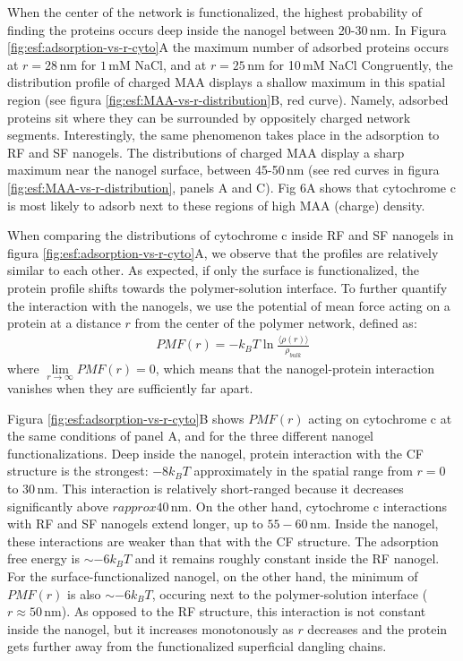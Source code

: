 When the center of the network is functionalized, the highest probability of finding the proteins occurs deep inside the nanogel between 20-30\,nm.
In Figura \ref{fig:esf:adsorption-vs-r-cyto}A the maximum number of adsorbed proteins occurs at $r=28$\,nm for $1$\,mM NaCl, and at $r=25$\,nm for 10\,mM NaCl%
Congruently, the distribution profile of charged MAA displays a shallow maximum in this spatial region (see figura \ref{fig:esf:MAA-vs-r-distribution}B, red curve).
Namely, adsorbed proteins sit where they can be surrounded by oppositely charged network segments.
Interestingly, the same phenomenon takes place in the adsorption to RF and SF nanogels.
The distributions of charged MAA display a sharp maximum near the nanogel surface, between 45-50\,nm (see red curves in  figura \ref{fig:esf:MAA-vs-r-distribution}, panels A and C).
Fig 6A shows that cytochrome c is most likely to adsorb next to these  regions of high MAA (charge) density.



When comparing the distributions of cytochrome c inside RF and SF nanogels in figura \ref{fig:esf:adsorption-vs-r-cyto}A, we observe that the profiles are relatively similar to each other.
As expected, if only the surface is functionalized, the protein profile shifts towards the polymer-solution interface.
To further quantify the interaction with the nanogels, we use the potential of mean force acting on a protein at a distance $r$ from the center of the polymer network, defined as:
\begin{align}
   {PMF} (r) = -k_B T \ln \frac{\langle \rho(r)\rangle}{\rho_{bulk}}
\end{align}
where $\lim\limits_{r\to \infty}{PMF}(r)=0$, which means that the nanogel-protein interaction vanishes when they are sufficiently far apart.





Figura \ref{fig:esf:adsorption-vs-r-cyto}B shows ${PMF}(r)$ acting on cytochrome c at the same conditions of panel A, and for the three different nanogel functionalizations.
Deep inside the nanogel, protein interaction with the CF structure is the strongest: $-8k_B T$ approximately in the spatial range from $r=0$ to 30\,nm.
This interaction is relatively short-ranged because it decreases significantly above $r approx 40$\,nm.
On the other hand,  cytochrome c interactions with RF and SF nanogels extend longer, up to $55-60$\,nm.
Inside the nanogel, these interactions are weaker than that with the CF structure.
The adsorption free energy is $\sim -6 k_BT$ and it remains roughly constant inside the RF nanogel.
For the surface-functionalized nanogel, on the other hand, the minimum of ${PMF}(r)$ is also $\sim -6 k_BT$, occuring next to the polymer-solution interface ($r\approx 50$\,nm).
As opposed to the RF structure, this interaction is not constant inside the nanogel, but it increases monotonously as $r$ decreases and the protein gets further away from the functionalized superficial dangling chains.












